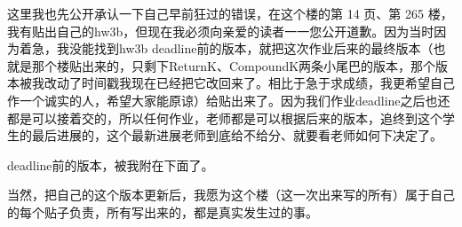 \documentclass[12pt]{book}
\begin{document}
这里我也先公开承认一下自己早前狂过的错误，在这个楼的第 14 页、第 265 楼，我有贴出自己的hw3b，但现在我必须向亲爱的读者一一您公开道歉。因为当时因为着急，我没能找到hw3b deadline前的版本，就把这次作业后来的最终版本（也就是那个楼贴出来的，只剩下ReturnK、CompoundK两条小尾巴的版本，那个版本被我改动了时间戳我现在已经把它改回来了。相比于急于求成绩，我更希望自己作一个诚实的人，希望大家能原谅）给贴出来了。因为我们作业deadline之后也还都是可以接着交的，所以任何作业，老师都是可以根据后来的版本，追终到这个学生的最后进展的，这个最新进展老师到底给不给分、就要看老师如何下决定了。

deadline前的版本，被我附在下面了。

当然，把自己的这个版本更新后，我愿为这个楼（这一次出来写的所有）属于自己的每个贴子负责，所有写出来的，都是真实发生过的事。


\lstset{language=java,label= ,caption= ,numbers=none}
\end{document}
